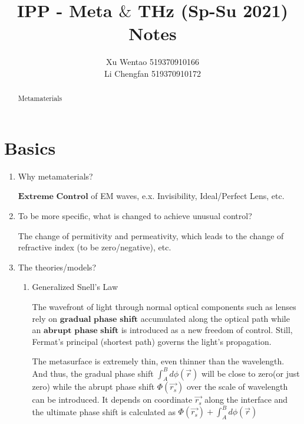 \documentclass[]{article}
\title{IPP - Meta $\&$ THz (Sp-Su 2021)\\
	Notes}
\author{Xu Wentao 519370910166\\Li Chengfan 519370910172}
\begin{document}
	
	\maketitle
	\begin{abstract}
		Metamaterials
		
	\end{abstract}
	
\clearpage
	\section*{Basics}
	\begin{enumerate}
		\item Why metamaterials?
		
		 $\textbf{Extreme Control}$ of EM waves, e.x. Invisibility, Ideal/Perfect Lens, etc.
		\item To be more specific, what is changed to achieve unusual control?
		
		The change of permitivity and permeativity, which leads to the change of refractive index (to be zero/negative), etc.
		\item The theories/models?
		\begin{enumerate}
			\item Generalized Snell's Law
			
			The wavefront of light through normal optical components such as lenses rely on $\textbf{gradual phase shift}$ accumulated along the optical path while an $\textbf{abrupt phase shift}$ is introduced as a new freedom of control. Still, Fermat's principal (shortest path) governs the light's propagation.
			
			The metasurface is extremely thin, even thinner than the wavelength. And thus, the gradual phase shift $\int_A^B d\phi (\vec{r})$ will be close to zero(or just zero) while the abrupt phase shift $\Phi(\vec{r_s})$ over the scale of wavelength can be introduced. It depends on coordinate $\vec{r_s}$ along the interface and the ultimate phase shift is calculated as $\Phi(\vec{r_s})+\int_A^B d\phi (\vec{r})$
			

\end{enumerate}
\end{enumerate}
\end{document}
